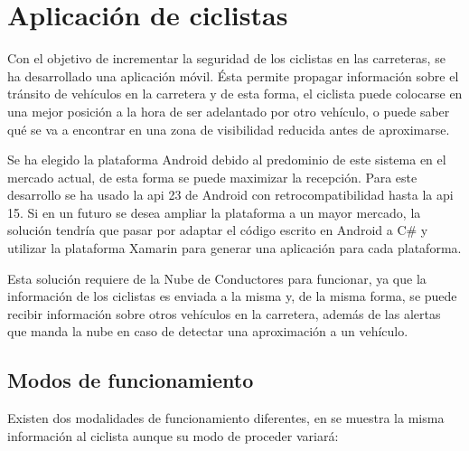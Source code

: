\section{Aplicación de ciclistas}\label{section:appCiclistas}
Con el objetivo de incrementar la seguridad de los ciclistas en las carreteras,
se ha desarrollado una aplicación móvil. Ésta permite propagar información
sobre el tránsito de vehículos en la carretera y de esta forma, el ciclista
puede colocarse en una mejor posición a la hora de ser adelantado por otro
vehículo, o puede saber qué se va a encontrar en una zona de visibilidad
reducida antes de aproximarse.

Se ha elegido la plataforma Android debido al predominio de este sistema en el
mercado actual, de esta forma se puede maximizar la recepción. Para este
desarrollo se ha usado la \gls{api} 23 de Android con retrocompatibilidad
hasta la \gls{api} 15. Si en un futuro se desea ampliar la plataforma a un
mayor mercado, la solución tendría que pasar por adaptar el código escrito en
Android a C\# y utilizar la plataforma Xamarin para generar una aplicación
para cada plataforma.

Esta solución requiere de la Nube de Conductores para funcionar, ya que la
información de los ciclistas es enviada a la misma y, de la misma forma, se
puede recibir información sobre otros vehículos en la carretera, además de
las alertas que manda la nube en caso de detectar una aproximación a un
vehículo.

\subsection{Modos de funcionamiento}\label{ssection:commHUB}
Existen dos modalidades de funcionamiento diferentes, en se muestra la misma
información al ciclista aunque su modo de proceder variará:

